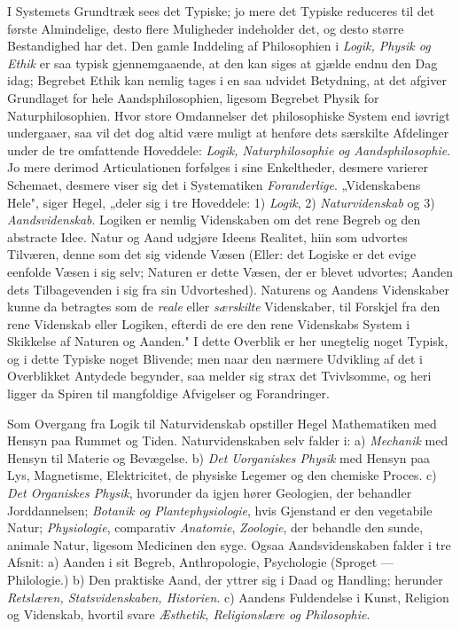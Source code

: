 \documentclass[12pt]{book}
\begin{document}
I Systemets Grundtræk sees det Typiske; jo mere det Typiske reduceres til det
første Almindelige, desto flere Muligheder indeholder det, og desto større
Bestandighed har det. Den gamle Inddeling af Philosophien i \emph{Logik, Physik og
Ethik} er saa typisk gjennemgaaende, at den kan siges at gjælde endnu den Dag idag;
Begrebet Ethik kan nemlig tages i en saa udvidet Betydning, at det afgiver
Grundlaget for hele Aandsphilosophien, ligesom Begrebet Physik for
Naturphilosophien. Hvor store Omdannelser det philosophiske System end iøvrigt
undergaaer, saa vil det dog altid være muligt at henføre dets særskilte Afdelinger
under de tre omfattende Hoveddele: \emph{Logik, Naturphilosophie og
Aandsphilosophie}. Jo mere derimod Articulationen forfølges i sine Enkeltheder,
desmere varierer Schemaet, desmere viser sig det i Systematiken \emph{Foranderlige}.
„Videnskabens Hele", siger Hegel, „deler sig i tre Hoveddele: 1) \emph{Logik}, 2)
\emph{Naturvidenskab} og 3) \emph{Aandsvidenskab}. Logiken er nemlig Videnskaben om
det rene Begreb og den abstracte Idee. Natur og Aand udgjøre Ideens Realitet, hiin
som udvortes Tilværen, denne som det sig vidende Væsen (Eller: det Logiske er det
evige eenfolde Væsen i sig selv; Naturen er dette Væsen, der er blevet udvortes;
Aanden dets Tilbagevenden i sig fra sin Udvorteshed). Naturens og Aandens
Videnskaber kunne da betragtes som de \emph{reale} eller \emph{særskilte}
Videnskaber, til Forskjel fra den rene Videnskab eller Logiken, efterdi de ere den
rene Videnskabs System i Skikkelse af Naturen og Aanden."
I dette Overblik er her unegtelig noget Typisk, og i dette Typiske noget Blivende;
men naar den nærmere Udvikling af det i Overblikket Antydede begynder, saa melder
sig strax det Tvivlsomme, og heri ligger da Spiren til mangfoldige Afvigelser og
Forandringer.

Som Overgang fra Logik til Naturvidenskab opstiller Hegel Mathematiken med Hensyn
paa Rummet og Tiden. Naturvidenskaben selv falder i: a) \emph{Mechanik} med Hensyn
til Materie og Bevægelse. b) \emph{Det Uorganiskes Physik} med Hensyn paa Lys,
Magnetisme, Elektricitet, de physiske Legemer og den chemiske Proces. c) \emph{Det
Organiskes Physik}, hvorunder da igjen hører Geologien, der behandler
Jorddannelsen; \emph{Botanik og Plantephysiologie}, hvis Gjenstand er den vegetabile
Natur; \emph{Physiologie}, comparativ \emph{Anatomie}, \emph{Zoologie}, der behandle
den sunde, animale Natur, ligesom Medicinen den syge. Ogsaa Aandsvidenskaben falder
i tre Afsnit: a) Aanden i sit Begreb, Anthropologie, Psychologie (Sproget ---
Philologie.) b) Den praktiske Aand, der yttrer sig i Daad og Handling; herunder
\emph{Retslæren, Statsvidenskaben, Historien}. c) Aandens Fuldendelse i Kunst,
Religion og Videnskab, hvortil svare \emph{Æsthetik, Religionslære og Philosophie}.
\end{document}
